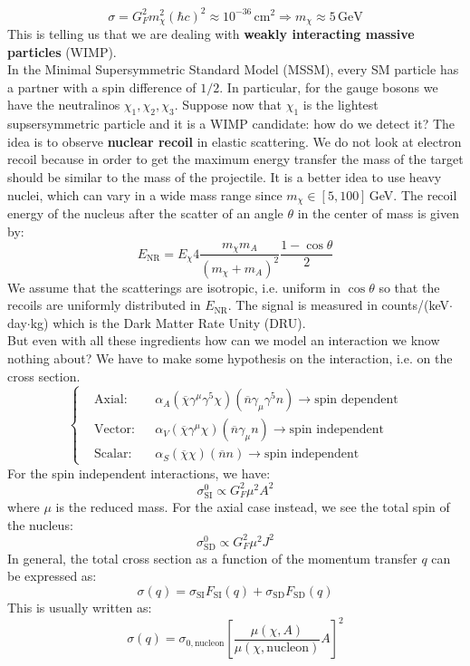 \documentclass[10.75pt,a4paper,openright,bottom=2cm]{article}
\begin{document}
\[
\sigma=G_F^2m_\chi^2(\hbar c)^2\approx10^{-36}\,\text{cm$^2$} \Rightarrow m_\chi\approx5\,\text{GeV}
\]
This is telling us that we are dealing with \textbf{weakly interacting massive particles} (WIMP).\\
In the Minimal Supersymmetric Standard Model (MSSM), every SM particle has a partner with a spin difference of $1/2$. In particular, for the gauge bosons we have the neutralinos $\chi_1, \chi_2, \chi_3$. Suppose now that $\chi_1$ is the lightest supsersymmetric particle and it is a WIMP candidate: how do we detect it? The idea is to observe \textbf{nuclear recoil} in elastic scattering. We do not look at electron recoil because in order to get the maximum energy transfer the mass of the target should be similar to the mass of the projectile. It is a better idea to use heavy nuclei, which can vary in a wide mass range since $m_\chi\in[5,100]$\,GeV. The recoil energy of the nucleus after the scatter of an angle $\theta$ in the center of mass is given by:
\[
E_{\text{NR}}=E_\chi 4\frac{m_\chi m_A}{(m_\chi+m_A)^2}\frac{1-\cos\theta}{2}
\]
We assume that the scatterings are isotropic, i.e. uniform in $\cos\theta$ so that the recoils are uniformly distributed in $E_{\text{NR}}$. The signal is measured in counts/(keV$\cdot$day$\cdot$kg) which is the Dark Matter Rate Unity (DRU).\\
But even with all these ingredients how can we model an interaction we know nothing about? We have to make some hypothesis on the interaction, i.e. on the cross section.
\[
\left\{
\begin{aligned}
&\text{Axial:}&&\alpha_A(\overline{\chi}\gamma^\mu\gamma^5\chi)(\overline{n}\gamma_\mu\gamma^5n)\to\text{spin dependent}\\
&\text{Vector:}&&\alpha_V(\overline{\chi}\gamma^\mu\chi)(\overline{n}\gamma_\mu n)\to\text{spin independent}\\
&\text{Scalar:}&&\alpha_S(\overline{\chi}\chi)(\overline{n}n)\to\text{spin independent}
\end{aligned}
\right.
\]
For the spin independent interactions, we have:
\[
\sigma_{\text{SI}}^0\propto G_F^2\mu^2A^2
\]
where $\mu$ is the reduced mass. For the axial case instead, we see the total spin of the nucleus:
\[
\sigma_{\text{SD}}^0\propto G_F^2\mu^2J^2
\]
In general, the total cross section as a function of the momentum transfer $q$ can be expressed as:
\[
\sigma(q)=\sigma_{\text{SI}}F_{\text{SI}}(q)+\sigma_{\text{SD}}F_{\text{SD}}(q)
\]
This is usually written as:
\[
\sigma(q)=\sigma_{0,\text{nucleon}}\left[\frac{\mu(\chi,A)}{\mu(\chi,\text{nucleon})}A\right]^2
\]
\end{document}
